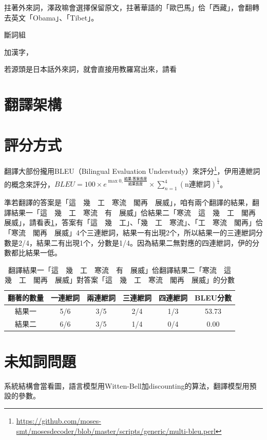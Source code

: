 \documentclass[final,oneside,onecolumn,12pt,a4paper]{book}%
\begin{document}
拄著外來詞，澤政嘛會選擇保留原文，拄著華語的「歐巴馬」佮「西藏」，會翻轉去英文「Obama」、「Tibet」。

斷詞組

加漢字，

若源頭是日本話外來詞，就會直接用教羅寫出來，請看

\section{翻譯架構}
\label{節：翻譯架構}

\section{評分方式}
\label{節：評分方式}

翻譯大部份攏用BLEU（Bilingual Evaluation Understudy）來評分\footnote{\url{https://github.com/moses-smt/mosesdecoder/blob/master/scripts/generic/multi-bleu.perl}}，伊用連紲詞的概念來評分，$BLEU=100\times{e^{\max{0,\frac{\textit{結果-答案長度}}{\textit{結果長度}}}}}\times{\sum_{n=1}^{4}(\textrm{n連紲詞})^{\frac{1}{4}}}$。

準若翻譯的答案是「這　幾　工　寒流　閣再　展威」，咱有兩个翻譯的結果，翻譯結果一「這　幾　工　寒流　有　展威」佮結果二「寒流　這　幾　工　閣再　展威」，請看表\ref{表：範例BLEU分數}，答案有「這　幾　工」、「幾　工　寒流」、「工　寒流　閣再」佮「寒流　閣再　展威」4个三連紲詞，結果一有出現2个，所以結果一的三連紲詞分數是2/4，結果二有出現1个，分數是1/4。因為結果二無對應的四連紲詞，伊的分數都比結果一低。

\begin{table}
\caption{翻譯結果一「這　幾　工　寒流　有　展威」佮翻譯結果二「寒流　這　幾　工　閣再　展威」對答案「這　幾　工　寒流　閣再　展威」的分數}%
\label{表：範例BLEU分數}
\centering
\begin{tabular}{|c|cccc|c|}
\hline
翻著的數量 & 一連紲詞 & 兩連紲詞 & 三連紲詞 & 四連紲詞 & BLEU分數\\
\hline
結果一 & 5/6 & 3/5 & 2/4 & 1/3 & 53.73\\
\hline
結果二 & 6/6 & 3/5 & 1/4 & 0/4 & 0.00\\
\hline
\end{tabular}
\end{table}


\section{未知詞問題}
\label{節：未知詞問題}
系統結構會當看圖，語言模型用Witten-Bell加discounting的算法，翻譯模型用預設的參數。
\end{document}
